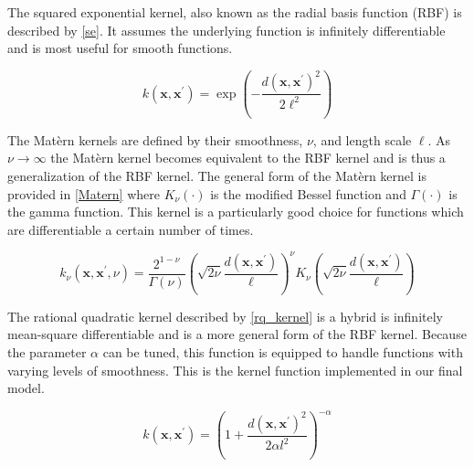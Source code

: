 \documentclass[journal=jacsat,manuscript=article]{achemso}
\begin{document}
The squared exponential kernel, also known as the radial basis function (RBF) is described by \eqref{se}. It assumes the underlying function is infinitely differentiable and is most useful for smooth functions.

\begin{equation}
    k(\mathbf{x}, \mathbf{x}^{\prime}) = \exp\left(-\frac{d(\mathbf{x}, \mathbf{x}^{\prime})^2}{2\ell^2} \right)
    \label{se}
\end{equation}

The Mat\`ern kernels are defined by their smoothness, $\nu$, and length scale $\ell$. As $\nu \rightarrow \infty$ the Mat\`ern kernel becomes equivalent to the RBF kernel and is thus a generalization of the RBF kernel. The general form of the Mat\`ern kernel is provided in \eqref{Matern} where $K_\nu(\cdot)$ is the modified Bessel function and $\Gamma(\cdot)$ is the gamma function. This kernel is a particularly good choice for functions which are differentiable a certain number of times.

\begin{equation}
    k_\nu(\mathbf{x}, \mathbf{x}^{\prime}, \nu) = \frac{2^{1-\nu}}{\Gamma(\nu)} \left( \sqrt{2\nu} \frac{d(\mathbf{x}, \mathbf{x}^{\prime})}{\ell} \right)^\nu K_\nu \left( \sqrt{2\nu} \frac{d(\mathbf{x}, \mathbf{x}^{\prime})}{\ell} \right)
    \label{Matern}
\end{equation}

The rational quadratic kernel described by \eqref{rq_kernel} is a hybrid is infinitely mean-square differentiable \cite{Gramacy2020Surrogates:Sciences} and is a more general form of the RBF kernel. Because the parameter $\alpha$ can be tuned, this function is equipped to handle functions with varying levels of smoothness. This is the kernel function implemented in our final model.

\begin{equation}
    k(\mathbf{x}, \mathbf{x}^{\prime}) = \left(1 + \frac{d(\mathbf{x}, \mathbf{x}^{\prime})^2}{2\alpha l^2}\right)^{-\alpha}
    \label{rq_kernel}
\end{equation}



\end{document}

